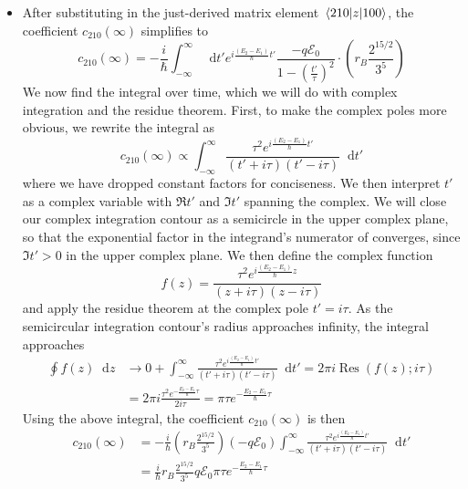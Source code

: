 \documentclass[11pt, a4paper]{article}
\newcommand{\diff}{\mathop{}\!\mathrm{d}} %
\newcommand{\E}{\mathcal{E}}  %
\begin{document}
\begin{itemize}
	\item After substituting in the just-derived matrix element $ \mel{210}{z}{100} $, the coefficient $ c_{210}(\infty) $ simplifies to
	\begin{equation*}
		c_{210}(\infty) = - \frac{i}{\hbar}\int_{-\infty}^{\infty} \diff t' e^{i \frac{(E_{2} - E_{1})}{\hbar}t'} \frac{-q\E_{0}}{1 - \left(\frac{t'}{\tau}\right)^{2}} \cdot \left(r_{B}\frac{2^{15/2}}{3^{5}}\right) 
	\end{equation*}
	We now find the integral over time, which we will do with complex integration and the residue theorem. First, to make the complex poles more obvious, we rewrite the integral as
	\begin{equation*}
		c_{210}(\infty) \propto \int_{-\infty}^{\infty} \frac{\tau^{2} e^{i\frac{(E_{2}-E_{1})}{\hbar}t'}}{(t' + i \tau)(t' - i \tau)} \diff t'
	\end{equation*}
	where we have dropped constant factors for conciseness.	We then interpret $ t' $ as a complex variable with $ \Re t' $ and $ \Im t' $ spanning the complex. We will close our complex integration contour as a semicircle in the upper complex plane, so that the exponential factor in the integrand's numerator of converges, since $ \Im t' > 0 $ in the upper complex plane. We then define the complex function
	\begin{equation*}
		f(z) = \frac{\tau^{2} e^{i\frac{(E_{2}-E_{1})}{\hbar}z}}{(z + i \tau)(z - i \tau)}
	\end{equation*}
	and apply the residue theorem at the complex pole $ t' = i \tau $. As the semicircular integration contour's radius approaches infinity, the integral approaches
	\begin{align*}
		\oint f(z) \diff z &\to 0 + \int_{-\infty}^{\infty} \frac{\tau^{2} e^{i\frac{(E_{2}-E_{1})}{\hbar}t'} }{(t' + i \tau)(t' - i \tau)} \diff t' = 
		 2\pi i \operatorname{Res}(f(z); i \tau) \\[1mm]
		& = 2\pi i \frac{\tau^{2}e^{-\frac{E_{2} - E_{1}}{\hbar}\tau}}{2i \tau} = \pi \tau e^{-\frac{E_{2} - E_{1}}{\hbar}\tau}
	\end{align*}
	Using the above integral, the coefficient $ c_{210}(\infty) $ is then
	\begin{align*}
		c_{210}(\infty) &= -\frac{i}{\hbar}\left(r_{B}\frac{2^{15/2}}{3^{5}}\right) (-q\E_{0}) \int_{-\infty}^{\infty} \frac{\tau^{2} e^{i\frac{(E_{2}-E_{1})}{\hbar}t'}}{(t' + i \tau)(t' - i \tau)} \diff t'\\
		 & = \frac{i}{\hbar} r_{B} \frac{2^{15/2}}{3^{5}}q \E_{0} \pi \tau e^{-\frac{E_{2} - E_{1}}{\hbar}\tau}
	\end{align*}
	

\end{itemize}
\end{document}
